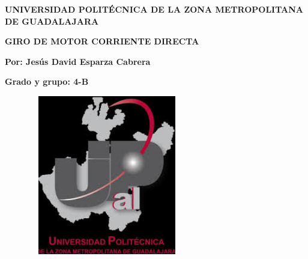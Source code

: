 \documentclass[12pt]{article}
\begin{document}
\setlength{\parskip}{14.04pt}
\textbf{UNIVERSIDAD POLITÉCNICA DE LA ZONA METROPOLITANA DE GUADALAJARA}\par

\textbf{\textcolor[HTML]{ED1C24}{GIRO DE MOTOR CORRIENTE DIRECTA}}\par

\textbf{Por: Jesús David Esparza Cabrera}\par

\textbf{Grado y grupo: 4-B}\par




\begin{figure}[H]
	\begin{Center}
		\includegraphics[width=2.71in,height=2.74in]{./media/image1.png}
	\end{Center}
\end{figure}



\par


\vspace{\baselineskip}

\vspace{\baselineskip}

\vspace{\baselineskip}

\vspace{\baselineskip}

\vspace{\baselineskip}

\vspace{\baselineskip}
\end{document}
